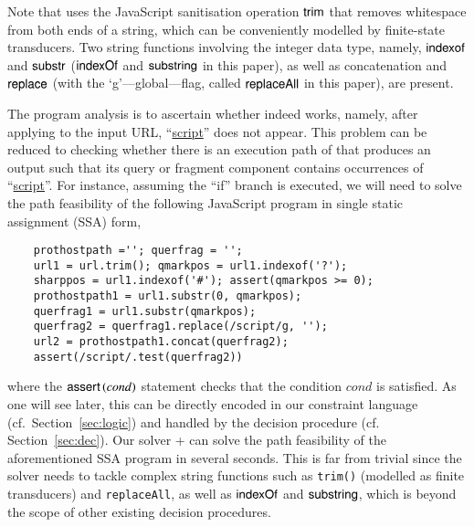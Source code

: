 \noindent Note that {\urlxsssanitise} uses the JavaScript sanitisation operation $\sf trim$ that removes whitespace from both ends of a string, which can be conveniently modelled by finite-state transducers. Two string functions involving the integer data type, namely, $\sf indexof$ and $\sf substr$ ($\mathsf{indexOf}$ and $\mathsf{substring}$ in this paper), as well as concatenation and $\sf replace$ (with the `g'---global---flag, called $\mathsf{replaceAll}$ in this paper), are present. 



The program analysis is to ascertain whether {\urlxsssanitise} indeed works, namely, after applying {\urlxsssanitise} to the input URL, ``\url{script}'' does not appear.  This problem can be reduced to checking whether there is an execution path of {\urlxsssanitise} that produces an output such that its query or fragment component contains occurrences of ``\url{script}''. For instance, assuming  the ``if'' branch is executed, %
we will need to solve the path feasibility of the following JavaScript program in single static assignment (SSA) form,

{\small
	\begin{verbatim}
	prothostpath =''; querfrag = '';
	url1 = url.trim(); qmarkpos = url1.indexof('?');
	sharppos = url1.indexof('#'); assert(qmarkpos >= 0); 
	prothostpath1 = url1.substr(0, qmarkpos);
	querfrag1 = url1.substr(qmarkpos);
	querfrag2 = querfrag1.replace(/script/g, '');
	url2 = prothostpath1.concat(querfrag2);
	assert(/script/.test(querfrag2))
	\end{verbatim}
}

\vspace*{-0.5ex}
\noindent where the $\textsf{assert}\left(cond\right)$ statement checks that the condition $cond$ is satisfied. As one will see later, this can be directly encoded in our constraint language (cf.\ Section~\ref{sec:logic}) and handled by the decision procedure (cf. Section~\ref{sec:dec}). 
Our solver  {\ostrich}+ can solve the path feasibility of the aforementioned 
SSA program in several seconds. This is far from trivial since %
the solver needs to tackle complex string functions such as {\tt trim()} (modelled as finite transducers) and {\tt replaceAll}, %
as well as %
$\mathsf{indexOf}$  and $\mathsf{substring}$, which is beyond the scope of other existing decision procedures.  

